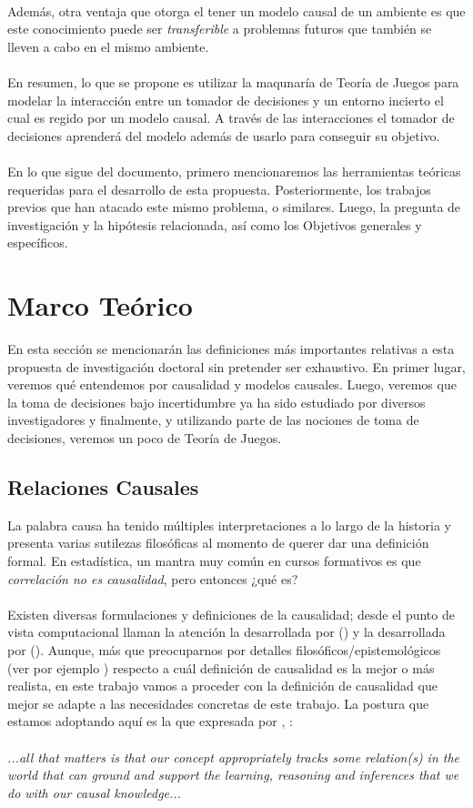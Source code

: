 \documentclass[11pt]{article}
\theoremstyle{plain}
\begin{document}
\\
\indent Además, otra ventaja que otorga el tener un modelo causal de un ambiente es que este conocimiento puede ser \textit{transferible} a problemas futuros que también se lleven a cabo en el mismo ambiente. \\
\\
\indent En resumen, lo que se propone es utilizar la maqunaría de Teoría de Juegos para modelar la interacción entre un tomador de decisiones y un entorno incierto el cual es regido por un modelo causal. A través de las interacciones el tomador de decisiones aprenderá del modelo además de usarlo para conseguir su objetivo.\\
\\
En lo que sigue del documento, primero mencionaremos las herramientas teóricas requeridas para el desarrollo de esta propuesta. Posteriormente, los trabajos previos que han atacado este mismo problema, o similares. Luego, la pregunta de investigación y la hipótesis relacionada, así como los Objetivos generales y específicos.
\section{Marco Teórico}
En esta sección se mencionarán las definiciones más importantes relativas a esta propuesta de investigación doctoral sin pretender ser exhaustivo. En primer lugar, veremos qué entendemos por causalidad y modelos causales. Luego, veremos que la toma de decisiones bajo incertidumbre ya ha sido estudiado por diversos investigadores y finalmente, y utilizando parte de las nociones de toma de decisiones, veremos un poco de Teoría de Juegos.
\subsection{Relaciones Causales}
La palabra causa ha tenido múltiples interpretaciones a lo largo de la historia y presenta varias sutilezas filosóficas al momento de querer dar una definición formal. En estadística, un mantra muy común en cursos formativos es que \textit{correlación no es causalidad}, pero entonces ¿qué es?\\
\\
\indent Existen diversas formulaciones y definiciones de la causalidad; desde el punto de vista computacional llaman la atención la desarrollada por (\cite{pearl2009causality}) y la desarrollada por  (\cite{spirtes2000causation}). Aunque, más que preocuparnos por detalles filosóficos/epistemológicos (ver por ejemplo \cite{arlo2016readings}) respecto a cuál definición de causalidad es la mejor o más realista, en este trabajo vamos a proceder con la definición de causalidad que mejor se adapte a las necesidades concretas de este trabajo. La postura que estamos adoptando aquí es la que expresada por \cite{danks2013functions}, \cite{danks2014unifying}:\\
\\
\indent \textit{...all that matters is that our concept appropriately tracks some relation(s) in the world that can ground and support the learning, reasoning and inferences that we do with our causal knowledge...}
\end{document}
